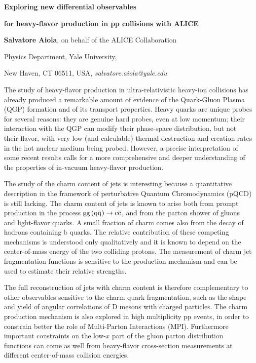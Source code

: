 \documentclass[12pt]{article}
\begin{document}
\centerline{\bf 
Exploring new differential observables
}

\centerline{\bf 
for heavy-flavor production in pp collisions with ALICE
}

\vspace{12pt}

\centerline{ {\bf Salvatore Aiola}, on behalf of the ALICE Collaboration }

\vspace{12pt}

\centerline{Physics Department, Yale University,
}\centerline{New Haven, CT 06511, USA, {\it salvatore.aiola@yale.edu}}

\vspace{12pt}


\vspace{12pt} \vspace{12pt}
The study of heavy-flavor production in ultra-relativistic heavy-ion collisions has already produced
a remarkable amount of evidence of the Quark-Gluon Plasma (QGP) formation and of its transport properties. 
Heavy quarks are unique probes for several reasons: they are genuine hard probes, even at low momentum;
their interaction with the QGP can modify their phase-space distribution, but not their flavor, with very low
(and calculable) thermal destruction and creation rates in the hot nuclear medium being probed.
However, a precise interpretation of some recent results calls for a more comprehensive and deeper understanding
of the properties of in-vacuum heavy-flavor production.

The study of the charm content of jets is interesting because 
a quantitative description in the framework of perturbative
Quantum Chromodynamics (pQCD) is still lacking.
The charm content of jets is known to arise both from prompt production 
in the process ${\rm gg\, (q\bar{q})} \rightarrow {\rm c\bar{c}}$, and
from the parton shower of gluons and light-flavor quarks. A small fraction of charm
comes also from the decay of hadrons containing b quarks.
The relative contribution of these competing mechanisms is understood only qualitatively
and it is known to depend on the center-of-mass energy of the two colliding protons.
The measurement of charm jet fragmentation functions is sensitive to the production mechanism and 
can be used to estimate their relative strengths.

The full reconstruction of jets with charm content is therefore complementary to other observables sensitive to the charm quark fragmentation, 
such as the shape and yield of angular correlations of D mesons with
charged particles. The charm production mechanism is also explored in high multiplicity pp events,
in order to constrain better the role of Multi-Parton Interactions (MPI).
Furthermore important constraints on the low-$x$ part of the gluon parton distribution functions can come
as well from heavy-flavor cross-section measurements at different center-of-mass collision energies.
\end{document}
